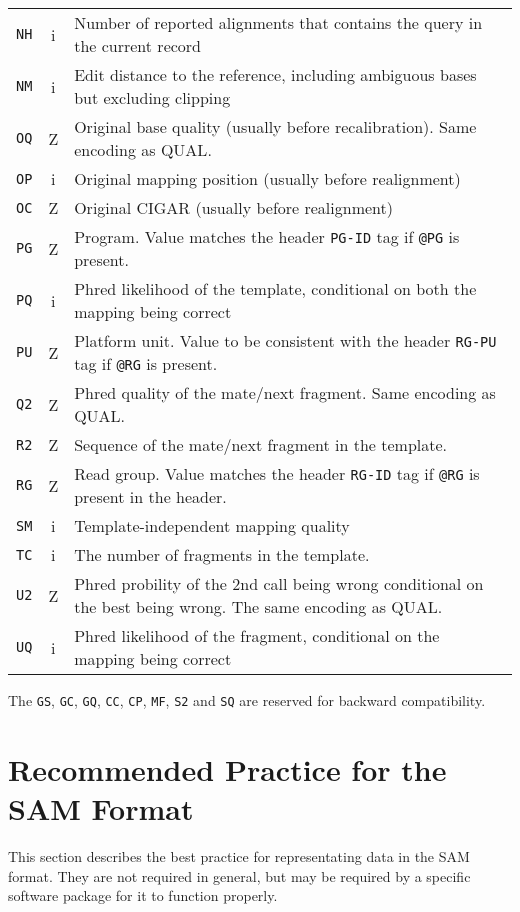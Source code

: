 \documentclass[10pt]{article}
\begin{document}
\begin{center}
\begin{tabular}{ccp{12.5cm}}
  {\tt NH} & i & Number of reported alignments that contains the query in the current record\\
  {\tt NM} & i & Edit distance to the reference, including ambiguous bases but excluding clipping \\
  {\tt OQ} & Z & Original base quality (usually before recalibration). Same encoding as {\sf QUAL}.\\
  {\tt OP} & i & Original mapping position (usually before realignment) \\
  {\tt OC} & Z & Original CIGAR (usually before realignment) \\
  {\tt PG} & Z & Program. Value matches the header {\tt PG-ID} tag if {\tt @PG} is present. \\
  {\tt PQ} & i & Phred likelihood of the template, conditional on both the mapping being correct \\
  {\tt PU} & Z & Platform unit. Value to be consistent with the header {\tt RG-PU} tag if {\tt @RG} is present.\\
  {\tt Q2} & Z & Phred quality of the mate/next fragment. Same encoding as {\sf QUAL}.\\
  {\tt R2} & Z & Sequence of the mate/next fragment in the template. \\
  {\tt RG} & Z & Read group. Value matches the header {\tt RG-ID} tag if {\tt @RG} is present in the header. \\
  {\tt SM} & i & Template-independent mapping quality \\
  {\tt TC} & i & The number of fragments in the template.\\
  {\tt U2} & Z & Phred probility of the 2nd call being wrong conditional on the best being wrong. The same encoding as {\sf QUAL}. \\
  {\tt UQ} & i & Phred likelihood of the fragment, conditional on the mapping being correct \\
  \hline
\end{tabular}
\end{center}
The {\tt GS}, {\tt GC}, {\tt GQ}, {\tt CC}, {\tt CP}, {\tt MF}, {\tt S2}
and {\tt SQ} are reserved for backward compatibility.

\pagebreak

\section{Recommended Practice for the SAM Format}
This section describes the best practice for representating data in the
SAM format. They are not required in general, but may be required by a
specific software package for it to function properly.
\end{document}
